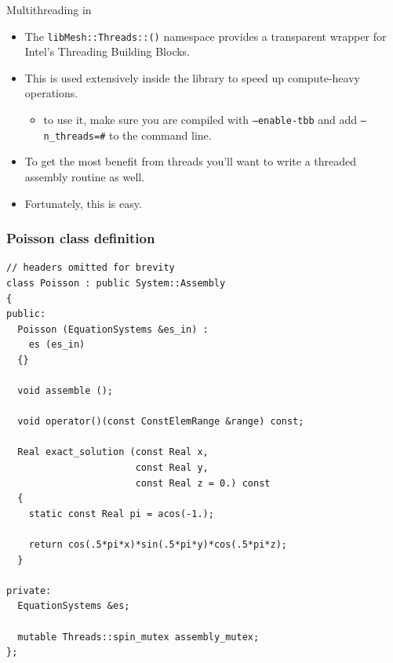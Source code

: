 \begin{frame}
  \begin{block}{Multithreading in \libMesh{}}
    \begin{itemize}
    \item The \texttt{libMesh::Threads::()} namespace provides a transparent wrapper for Intel's Threading Building Blocks.
    \item This is used extensively inside the library to speed up compute-heavy operations.
      \begin{itemize}
        \item to use it, make sure you are compiled with \texttt{--enable-tbb} and add \texttt{--n\_threads=\#} to the command line.
      \end{itemize}
      \item To get the most benefit from threads you'll want to write a threaded assembly routine as well.
      \item Fortunately, this is easy.
    \end{itemize}
  \end{block}
\end{frame}


\begin{frame}
  \frametitle{Poisson class definition}

  \begin{lstlisting}
// headers omitted for brevity
class Poisson : public System::Assembly
{
public:
  Poisson (EquationSystems &es_in) :
    es (es_in)
  {}

  void assemble ();

  void operator()(const ConstElemRange &range) const;

  Real exact_solution (const Real x,
                       const Real y,
                       const Real z = 0.) const
  {
    static const Real pi = acos(-1.);

    return cos(.5*pi*x)*sin(.5*pi*y)*cos(.5*pi*z);
  }

private:
  EquationSystems &es;

  mutable Threads::spin_mutex assembly_mutex;
};
  \end{lstlisting}
\end{frame}



